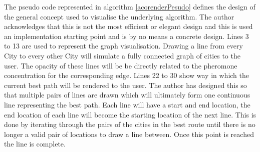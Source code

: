 The pseudo code represented in algorithm \ref{acorenderPesudo} defines the design of the general concept used to visualise the underlying algorithm. The author acknowledges that this is not the most efficient or elegant design and this is used an implementation starting point and is by no means a concrete design. Lines 3 to 13 are used to represent the graph visualisation. Drawing a line from every City to every other City will simulate a fully connected graph of cities to the user. The opacity of these lines will be be directly related to the pheromone concentration for the corresponding edge. Lines 22 to 30 show way in which the current best path will be rendered to the user. The author has designed this so that multiple pairs of lines are drawn which will ultimately form one continuous line representing the best path. Each line will have a start and end location, the end location of each line will become the starting location of the next line. This is done by iterating through the pairs of the cities in the best route until there is no longer a valid pair of locations to draw a line between. Once this point is reached the line is complete.